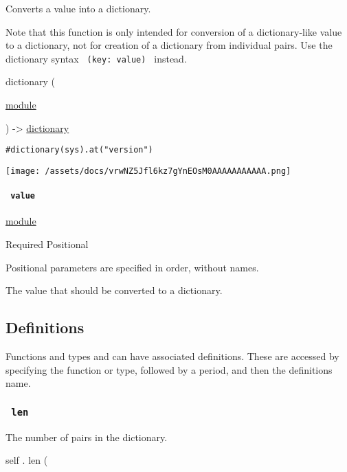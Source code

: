 Converts a value into a dictionary.

Note that this function is only intended for conversion of a
dictionary-like value to a dictionary, not for creation of a dictionary
from individual pairs. Use the dictionary syntax
\texttt{\ (key:\ value)\ } instead.

{ dictionary } (

{ \href{/docs/reference/foundations/module/}{module} }

) -\textgreater{}
\href{/docs/reference/foundations/dictionary/}{dictionary}

\begin{verbatim}
#dictionary(sys).at("version")
\end{verbatim}

\texttt{[image: /assets/docs/vrwNZ5Jfl6kz7gYnEOsM0AAAAAAAAAAA.png]}

\paragraph{\texorpdfstring{\texttt{\ value\ }}{ value }}\label{constructor-value}

\href{/docs/reference/foundations/module/}{module}

{Required} {{ Positional }}

\label{constructor-value-positional-tooltip}
Positional parameters are specified in order, without names.

The value that should be converted to a dictionary.

\subsection{\texorpdfstring{{ Definitions
}}{ Definitions }}\label{definitions}

\label{definitions-tooltip}
Functions and types and can have associated definitions. These are
accessed by specifying the function or type, followed by a period, and
then the definition\textquotesingle s name.

\subsubsection{\texorpdfstring{\texttt{\ len\ }}{ len }}\label{definitions-len}

The number of pairs in the dictionary.

self { . } { len } (

